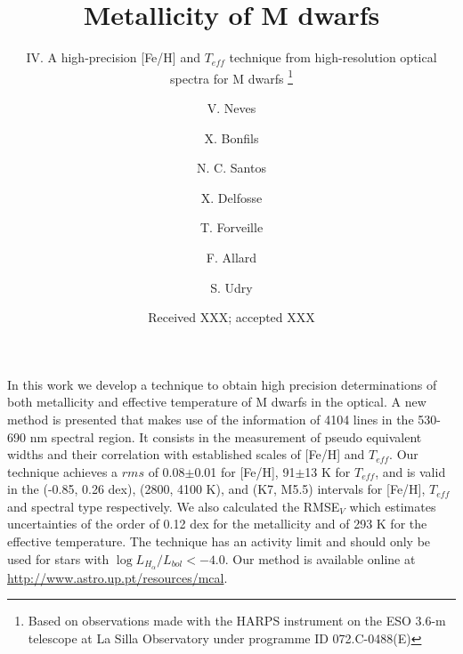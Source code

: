 \documentclass{aa}
\begin{document}
 


   \title{Metallicity of M dwarfs }

  \subtitle{IV. A high-precision [Fe/H] and $T_{eff}$ technique from high-resolution optical spectra for M dwarfs \thanks{Based on observations made with the HARPS instrument on the ESO 3.6-m telescope at La Silla Observatory under programme ID 072.C-0488(E)}}

\author{ V. Neves \and X. Bonfils \and
  N. C. Santos \and X. Delfosse \and
  T. Forveille  \and F. Allard  \and
  S. Udry}

   \date{Received XXX; accepted XXX}

 
  \abstract
{}
   {In this work we develop a technique to obtain high precision determinations of both metallicity and effective temperature of M dwarfs in the optical.}
   {A new method is presented that makes use of the information of 4104 lines in the 530-690 nm spectral region. It consists in the measurement of pseudo equivalent widths and their correlation with established scales of [Fe/H] and $T_{eff}$.}
   {Our technique achieves a $rms$ of 0.08$\pm$0.01 for [Fe/H], 91$\pm$13 K for $T_{eff}$, and is valid in the (-0.85, 0.26 dex), (2800, 4100 K), and (K7, M5.5) intervals for [Fe/H], $T_{eff}$ and spectral type respectively. We also calculated the RMSE$_{V}$ which estimates uncertainties of the order of 0.12 dex for the metallicity and of 293 K for the effective temperature. The technique has an activity limit and should only be used for stars with  $\log{L_{H_{\alpha}}/L_{bol}} < -4.0$. Our method is available online at \url{http://www.astro.up.pt/resources/mcal}.  }
   {}
\end{document}

